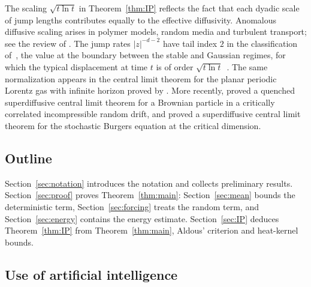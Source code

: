 \documentclass[11pt]{amsart}
\numberwithin{equation}{section}
\begin{document}
The scaling $\sqrt{t \ln t}$ in Theorem~\ref{thm:IP} reflects the fact that each dyadic scale of jump lengths contributes equally to the effective diffusivity.
Anomalous diffusive scaling arises in polymer models, random media and turbulent transport; see the review of \citet{BouchaudGeorges1990}.
The jump rates $|z|^{-d-2}$ have tail index $2$ in the classification of~\citet[Section~1.2]{BouchaudGeorges1990}, the value at the boundary between the stable and Gaussian regimes, for which the typical displacement at time $t$ is of order $\sqrt{t \ln t}$~\citep[eq.~(1.19)]{BouchaudGeorges1990}.
The same normalization appears in the central limit theorem for the planar periodic Lorentz gas with infinite horizon proved by \citet{SzaszVarju2007}.
More recently, \citet*{ArmstrongBouRabeeKuusi2024} proved a quenched superdiffusive central limit theorem for a Brownian particle in a critically correlated incompressible random drift, and \citet*{CannizzaroMoulardToninelli2025} proved a superdiffusive central limit theorem for the stochastic Burgers equation at the critical dimension.

\subsection{Outline}

Section~\ref{sec:notation} introduces the notation and collects preliminary results.
Section~\ref{sec:proof} proves Theorem~\ref{thm:main}: Section~\ref{sec:mean} bounds the deterministic term, Section~\ref{sec:forcing} treats the random term, and Section~\ref{sec:energy} contains the energy estimate.
Section~\ref{sec:IP} deduces Theorem~\ref{thm:IP} from Theorem~\ref{thm:main}, Aldous' criterion and heat-kernel bounds.

\subsection*{Use of artificial intelligence}
\end{document}
